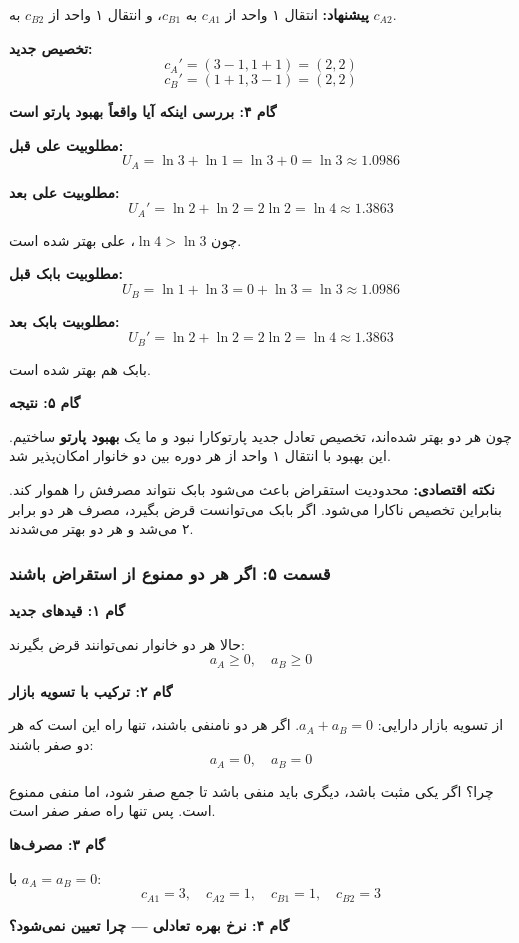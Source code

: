 \documentclass[12pt,a4paper]{article}
\begin{document}
\textbf{پیشنهاد:} انتقال ۱ واحد از $c_{A1}$ به $c_{B1}$، و انتقال ۱ واحد از $c_{B2}$ به $c_{A2}$.

\textbf{تخصیص جدید:}
\[
	c_A' = (3-1, 1+1) = (2, 2)
\]
\[
	c_B' = (1+1, 3-1) = (2, 2)
\]

\textbf{گام ۴: بررسی اینکه آیا واقعاً بهبود پارتو است}

\textbf{مطلوبیت علی قبل:}
\[
	U_A = \ln 3 + \ln 1 = \ln 3 + 0 = \ln 3 \approx 1.0986
\]

\textbf{مطلوبیت علی بعد:}
\[
	U_A' = \ln 2 + \ln 2 = 2 \ln 2 = \ln 4 \approx 1.3863
\]

چون $\ln 4 > \ln 3$، علی بهتر شده است.

\textbf{مطلوبیت بابک قبل:}
\[
	U_B = \ln 1 + \ln 3 = 0 + \ln 3 = \ln 3 \approx 1.0986
\]

\textbf{مطلوبیت بابک بعد:}
\[
	U_B' = \ln 2 + \ln 2 = 2 \ln 2 = \ln 4 \approx 1.3863
\]

بابک هم بهتر شده است.

\textbf{گام ۵: نتیجه}

چون هر دو بهتر شده‌اند، تخصیص تعادل جدید پارتوکارا نبود و ما یک \textbf{بهبود پارتو} ساختیم. این بهبود با انتقال ۱ واحد از هر دوره بین دو خانوار امکان‌پذیر شد.

\textbf{نکته اقتصادی:} محدودیت استقراض باعث می‌شود بابک نتواند مصرفش را هموار کند. بنابراین تخصیص ناکارا می‌شود. اگر بابک می‌توانست قرض بگیرد، مصرف هر دو برابر ۲ می‌شد و هر دو بهتر می‌شدند.

\subsubsection{قسمت ۵: اگر هر دو ممنوع از استقراض باشند}

\textbf{گام ۱: قیدهای جدید}

حالا هر دو خانوار نمی‌توانند قرض بگیرند:
\[
	a_A \geq 0, \quad a_B \geq 0
\]

\textbf{گام ۲: ترکیب با تسویه بازار}

از تسویه بازار دارایی: $a_A + a_B = 0$. اگر هر دو نامنفی باشند، تنها راه این است که هر دو صفر باشند:
\[
	a_A = 0, \quad a_B = 0
\]

چرا؟ اگر یکی مثبت باشد، دیگری باید منفی باشد تا جمع صفر شود، اما منفی ممنوع است. پس تنها راه صفر صفر است.

\textbf{گام ۳: مصرف‌ها}

با $a_A = a_B = 0$:
\[
	c_{A1} = 3, \quad c_{A2} = 1, \quad c_{B1} = 1, \quad c_{B2} = 3
\]

\textbf{گام ۴: نرخ بهره تعادلی — چرا تعیین نمی‌شود؟}
\end{document}
